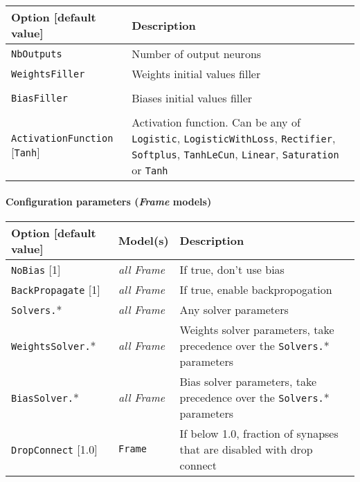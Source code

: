 \documentclass[a4paper,11pt,oneside]{article}
\begin{document}
\begin{center}
 \begin{longtable}{| p{5cm} | p{10cm} | }
 \hline
 Option [default value] & Description\\
 \hline\hline
  \cellcolor{requiredcolor}\lstinline!NbOutputs! & Number of output neurons \\
  \lstinline!WeightsFiller! & Weights initial values filler \\
   & \\
  \lstinline!BiasFiller! & Biases initial values filler \\
   & \\
  \lstinline!ActivationFunction! [\lstinline!Tanh!] & Activation function.
  Can be any of \lstinline!Logistic!,  \lstinline!LogisticWithLoss!,
  \lstinline!Rectifier!, \lstinline!Softplus!, \lstinline!TanhLeCun!,
  \lstinline!Linear!, \lstinline!Saturation! or \lstinline!Tanh! \\
 \hline
\end{longtable}
\end{center}

\paragraph{Configuration parameters (\emph{Frame} models)}

\begin{center}
 \begin{longtable}{| p{4cm} | p{3cm} | p{9cm} | }
 \hline
 Option [default value] & Model(s) & Description\\
 \hline\hline
  \lstinline!NoBias! [1] & \emph{all Frame} & If true, don't use bias \\
  \lstinline!BackPropagate! [1] & \emph{all Frame} & If true, enable
  backpropogation \\
  \lstinline!Solvers.!* & \emph{all Frame} & Any solver parameters \\
  \lstinline!WeightsSolver.!* & \emph{all Frame} & Weights solver parameters,
  take precedence over the \lstinline!Solvers.!* parameters \\
  \lstinline!BiasSolver.!* & \emph{all Frame} & Bias solver parameters,
  take precedence over the \lstinline!Solvers.!* parameters \\
  \lstinline!DropConnect! [1.0] & \lstinline!Frame! & If below 1.0, fraction of
  synapses that are disabled with drop connect \\
 \hline
\end{longtable}
\end{center}
\end{document}
